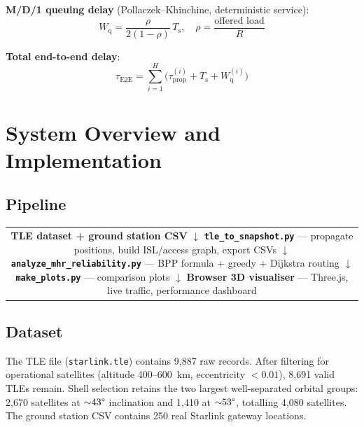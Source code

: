 \documentclass[12pt,a4paper]{report}
\newcommand{\Tprop}{\tau_{\mathrm{prop}}}
\newcommand{\Tser}{T_{\mathrm{s}}}
\newcommand{\Tq}{W_{\mathrm{q}}}
\newcommand{\TE}{\tau_{\mathrm{E2E}}}
\begin{document}
\textbf{M/D/1 queuing delay} (Pollaczek--Khinchine, deterministic service):
\begin{equation}
  \Tq = \frac{\rho}{2(1-\rho)}\,\Tser, \quad \rho = \frac{\text{offered load}}{R}
\end{equation}

\textbf{Total end-to-end delay}:
\begin{equation}
  \TE = \sum_{i=1}^{H}\bigl(\Tprop^{(i)} + \Tser + \Tq^{(i)}\bigr)
  \label{eq:e2e}
\end{equation}

\chapter{System Overview and Implementation}
\label{ch:impl}

\section{Pipeline}

\begin{center}
\small
\begin{tabular}{c}
\fbox{\parbox{0.80\textwidth}{\centering
\textbf{TLE dataset + ground station CSV}\\[2pt]$\downarrow$\\
\textbf{\texttt{tle\_to\_snapshot.py}} — propagate positions, build ISL/access graph, export CSVs\\[2pt]$\downarrow$\\
\textbf{\texttt{analyze\_mhr\_reliability.py}} — BPP formula + greedy + Dijkstra routing\\[2pt]$\downarrow$\\
\textbf{\texttt{make\_plots.py}} — comparison plots\\[2pt]$\downarrow$\\
\textbf{Browser 3D visualiser} — Three.js, live traffic, performance dashboard
}}
\end{tabular}
\end{center}

\section{Dataset}

The TLE file (\texttt{starlink.tle}) contains 9{,}887 raw records. After filtering for
operational satellites (altitude 400--600~km, eccentricity $<0.01$), 8{,}691 valid TLEs
remain. Shell selection retains the two largest well-separated orbital groups: 2{,}670
satellites at ${\sim}43\text{\textdegree}$ inclination and 1{,}410 at
${\sim}53\text{\textdegree}$, totalling 4{,}080 satellites. The ground station CSV
contains 250 real Starlink gateway locations.
\end{document}

